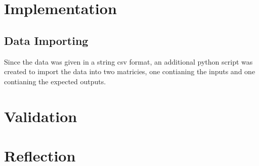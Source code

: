 \documentclass[10pt]{article}
\begin{document}

\section{Implementation}
\subsection{Data Importing}
Since the data was given in a string csv format, an additional python script was created to import the data into two matricies, one contianing the inputs and one contianing the expected outputs.
\section{Validation}
\section{Reflection}
\end{document}

